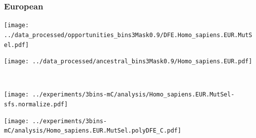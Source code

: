 \subsubsection{European}

\begin{minipage}{0.49\linewidth}
    \texttt{[image: ../data\_processed/opportunities\_bins3Mask0.9/DFE.Homo\_sapiens.EUR.MutSel.pdf]}
\end{minipage}
\begin{minipage}{0.49\linewidth}
    \texttt{[image: ../data\_processed/ancestral\_bins3Mask0.9/Homo\_sapiens.EUR.pdf]}
\end{minipage}
\\
\begin{minipage}{0.49\linewidth}
    \texttt{[image: ../experiments/3bins-mC/analysis/Homo\_sapiens.EUR.MutSel-sfs.normalize.pdf]}
\end{minipage}
\begin{minipage}{0.4\linewidth}
    \texttt{[image: ../experiments/3bins-mC/analysis/Homo\_sapiens.EUR.MutSel.polyDFE\_C.pdf]}
\end{minipage}
